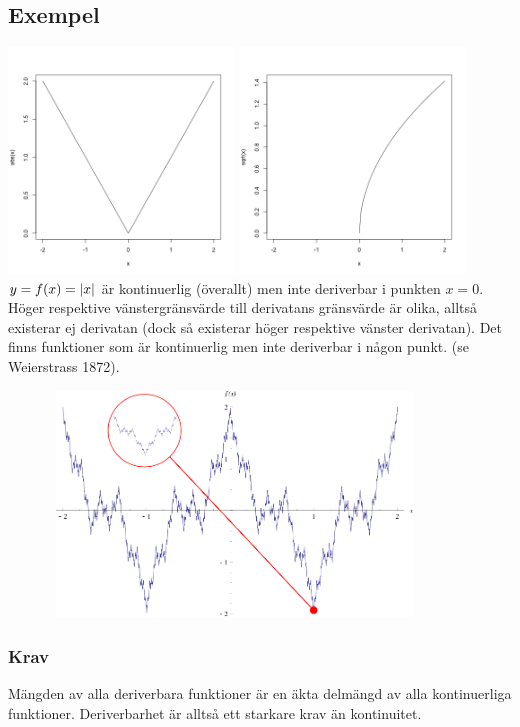 \documentclass{article}
\begin{document}
\subsection{Exempel}
\includegraphics[height=60mm, width=60mm]{img/abs.png}
\includegraphics[height=60mm, width=60mm]{img/sqrt.png}
$y=f(x)=\lvert x\rvert$ är kontinuerlig (överallt) men inte deriverbar i punkten $x = 0$.
Höger respektive vänstergränsvärde till derivatans gränsvärde är olika, alltså existerar ej derivatan
(dock så existerar höger respektive vänster derivatan).
Det finns funktioner som är kontinuerlig men inte deriverbar i någon punkt. (se Weierstrass 1872).

\includegraphics[height=60mm, width=120mm]{img/WeierstrassFunction.png}
\subsubsection{Krav}
Mängden av alla deriverbara funktioner är en äkta delmängd av alla kontinuerliga funktioner.
Deriverbarhet är alltså ett starkare krav än kontinuitet.
\end{document}
